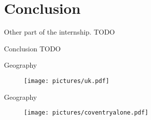 \documentclass{beamer}
\begin{document}
\section{Conclusion}


\begin{frame}{Other part of the internship.}
 TODO
\end{frame}

\begin{frame} {Conclusion}
  TODO
\end{frame}

\begin{frame}{Geography}
  \begin{figure}
  
     \begin{center}
	 \texttt{[image: pictures/uk.pdf]}
	 
  
    \end{center}

    
  \end{figure}

\end{frame}


\begin{frame}{Geography}
  \begin{figure}
  
     \begin{center}
	 \texttt{[image: pictures/coventryalone.pdf]}
	 
  
    \end{center}

    
  \end{figure}

\end{frame}


\end{document}
